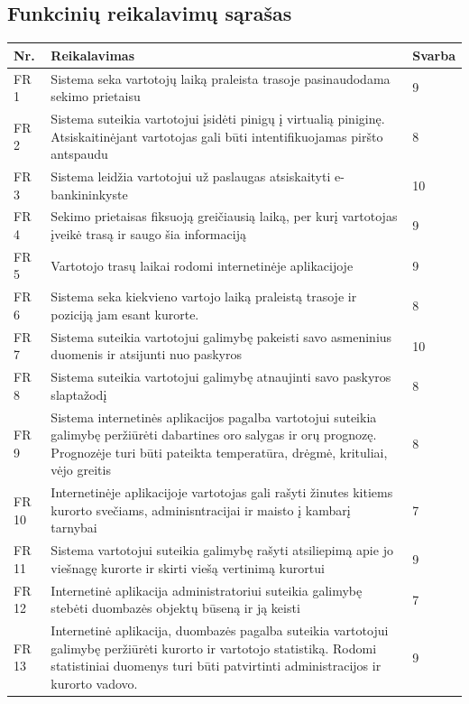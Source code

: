 \documentclass[oneside]{VUMIFPSkursinis}
\begin{document}
\subsection{Funkcinių reikalavimų sąrašas}
\begin{longtable}{ | p{}|p{}|p{}| }  \hline
	Nr. & Reikalavimas &  Svarba   \\ \hline
	FR 1 & Sistema seka vartotojų laiką praleista trasoje pasinaudodama sekimo prietaisu & 9 \\ \hline
	FR 2 & Sistema suteikia vartotojui įsidėti pinigų į virtualią piniginę. Atsiskaitinėjant vartotojas gali būti intentifikuojamas piršto antspaudu & 8 \\ \hline
	FR 3 & Sistema leidžia vartotojui už paslaugas atsiskaityti e-bankininkyste & 10 \\ \hline
	FR 4 & Sekimo prietaisas fiksuoją greičiausią laiką, per kurį vartotojas įveikė trasą ir saugo šia informaciją & 9 \\ \hline
	FR 5 & Vartotojo trasų laikai rodomi internetinėje aplikacijoje & 9 \\ \hline
	FR 6 & Sistema seka kiekvieno vartojo laiką praleistą trasoje ir poziciją jam esant kurorte.   & 8 \\ \hline
	FR 7 &  Sistema suteikia vartotojui galimybę pakeisti savo asmeninius duomenis ir atsijunti nuo paskyros& 10\\ \hline
	FR 8 & Sistema suteikia vartotojui galimybę atnaujinti savo paskyros slaptažodį & 8\\ \hline
	FR 9 & Sistema internetinės aplikacijos pagalba vartotojui suteikia galimybę peržiūrėti dabartines oro salygas ir orų prognozę. Prognozėje turi būti pateikta temperatūra, drėgmė, krituliai, vėjo greitis  & 8 \\ \hline
	FR 10 & Internetinėje aplikacijoje vartotojas gali rašyti žinutes kitiems kurorto svečiams, adminisntracijai ir maisto į kambarį tarnybai & 7 \\ \hline
	FR 11 & Sistema vartotojui suteikia galimybę rašyti atsiliepimą apie jo viešnagę kurorte ir skirti viešą vertinimą kurortui & 9 \\ \hline
	FR 12 & Internetinė aplikacija administratoriui suteikia galimybę stebėti duombazės objektų būseną ir ją keisti & 7 \\ \hline
	FR 13 & Internetinė aplikacija, duombazės pagalba suteikia vartotojui galimybę peržiūrėti kurorto ir vartotojo statistiką. Rodomi statistiniai duomenys turi būti patvirtinti administracijos ir kurorto vadovo. & 9 \\ \hline

\end{longtable}
\end{document}
